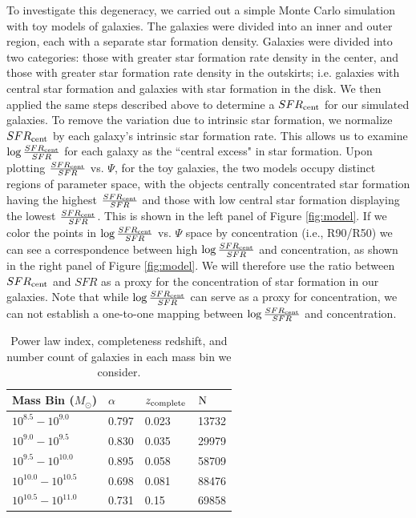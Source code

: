 \documentclass[iop]{emulateapj}
\begin{document}
To investigate this degeneracy, we carried out a simple Monte Carlo simulation with toy models of galaxies. The galaxies were divided into an inner and outer region, each with a separate star formation density. Galaxies were divided into two categories: those with greater star formation rate density in the center, and those with greater star formation rate density in the outskirts; i.e. galaxies with central star formation and galaxies with star formation in the disk. We then applied the same steps described above to determine a $SFR_{\rm cent}$ for our simulated galaxies. To remove the variation due to intrinsic star formation, we normalize $SFR_{\rm cent}$ by each galaxy's intrinsic star formation rate. This allows us to examine $ \log \frac{SFR_{\rm cent}}{SFR}$ for each galaxy as the ``central excess" in star formation. Upon plotting $\frac{SFR_{\rm cent}}{SFR}$ vs. $\Psi$, for the toy galaxies, the two models occupy distinct regions of parameter space, with the objects centrally concentrated star formation having the highest $\frac{SFR_{\rm cent}}{SFR}$ and those with low central star formation displaying the lowest $\frac{SFR_{\rm cent}}{SFR}$. This is shown in the left panel of Figure \ref{fig:model}. If we color the points in $ \log \frac{SFR_{\rm cent}}{SFR}$ vs. $\Psi$ space by concentration (i.e., R90/R50) we can see a correspondence between high $\log \frac{SFR_{\rm cent}}{SFR}$ and concentration, as shown in the right panel of Figure \ref{fig:model}. We will therefore use the ratio between $SFR_{\rm cent}$ and $SFR$ as a proxy for the concentration of star formation in our galaxies. Note that while $\log \frac{SFR_{\rm cent}}{SFR}$ can serve as a proxy for concentration, we can not establish a one-to-one mapping between $\log \frac{SFR_{\rm cent}}{SFR}$ and concentration. 

\begin{table}[]
	\centering
	\label{tab:infotab}
	\begin{tabular}{llll} 
	\hline 
	Mass Bin ($M_{\odot}$)& $\alpha$ & $z_{\rm complete}$ 	&  $\rm N$ \\
	\hline
	\hline 
	$10^{8.5} - 10^{9.0}$   & 0.797 & 0.023 & 13732\\
	$10^{9.0} - 10^{9.5}$   & 0.830  & 0.035  & 29979 \\ 
	$10^{9.5} - 10^{10.0}$   & 0.895    & 0.058 & 58709 \\
	$10^{10.0} - 10^{10.5}$   &  0.698 & 0.081 & 88476 \\
	$10^{10.5} - 10^{11.0}$   &  0.731 & 0.15 & 69858 \\
	\hline 
	\end{tabular}
		\caption{Power law index, completeness redshift, and number count of galaxies in each mass bin we consider. }
\end{table}
\end{document}
